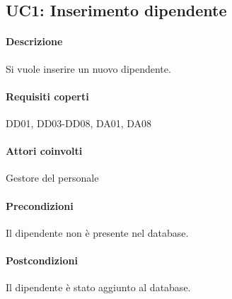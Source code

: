 \subsection{UC1: Inserimento dipendente}
\paragraph{Descrizione}
Si vuole inserire un nuovo dipendente.
\paragraph{Requisiti coperti}
DD01, DD03-DD08, DA01, DA08
\paragraph{Attori coinvolti}
Gestore del personale
\paragraph{Precondizioni}
Il dipendente non è presente nel database.
\paragraph{Postcondizioni}
Il dipendente è stato aggiunto al database.
